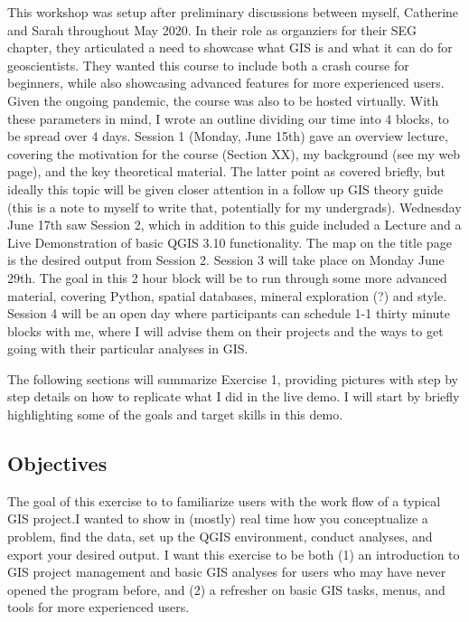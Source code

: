 \documentclass{article}
\begin{document}
This workshop was setup after preliminary discussions between myself, Catherine and Sarah throughout May 2020. In their role as organziers for their SEG chapter, they articulated a need to showcase what GIS is and what it can do for geoscientists. They wanted this course to include both a crash course for beginners, while also showcasing advanced features for more experienced users. Given the ongoing pandemic, the course was also to be hosted virtually. With these parameters in mind, I wrote an outline dividing our time into 4 blocks, to be spread over 4 days. Session 1 (Monday, June 15th) gave an overview lecture, covering the motivation for the course (Section XX), my background (see my web page), and the key theoretical material. The latter point as covered briefly, but ideally this topic will be given closer attention in a follow up GIS theory guide (this is a note to myself to write that, potentially for my undergrads). Wednesday June 17th saw Session 2, which in addition to this guide included a Lecture and a Live Demonstration of basic QGIS 3.10 functionality. The map on the title page is the desired output from Session 2. Session 3 will take place on Monday June 29th. The goal in this 2 hour block will be to run through some more advanced material, covering Python, spatial databases, mineral exploration (?) and style. Session 4 will be an open day where participants can schedule 1-1 thirty minute blocks with me, where I will advise them on their projects and the ways to get going with their particular analyses in GIS. 

The following sections will summarize Exercise 1, providing pictures with step by step details on how to replicate what I did in the live demo. I will start by briefly highlighting some of the goals and target skills in this demo. 

\subsection{Objectives}

The goal of this exercise to to familiarize users with the work flow of a typical GIS project.I wanted to show in (mostly) real time how you conceptualize a problem, find the data, set up the QGIS environment, conduct analyses, and export your desired output. I want this exercise to be both (1) an introduction to GIS project management and basic GIS analyses for users who may have never opened the program before, and (2) a refresher on basic GIS tasks, menus, and tools for more experienced users. 
\end{document}
